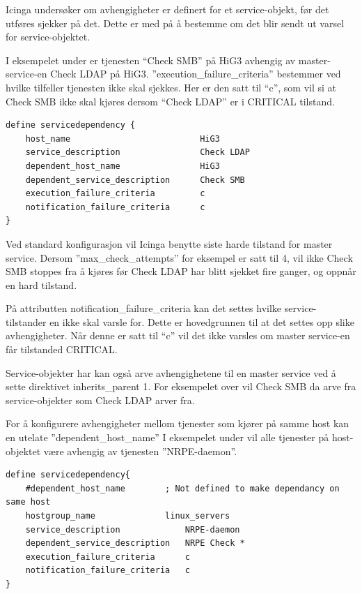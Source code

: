 Icinga undersøker om avhengigheter er definert for et service-objekt, før det utføres sjekker på det. Dette er med på å bestemme om det blir sendt ut varsel for service-objektet.

I eksempelet under er tjenesten ``Check SMB'' på HiG3 avhengig av master-service-en Check LDAP på HiG3. ''execution\_failure\_criteria'' bestemmer ved hvilke tilfeller tjenesten ikke skal sjekkes. Her er den satt til ``c'', som vil si at Check SMB ikke skal kjøres dersom ``Check LDAP'' er i CRITICAL tilstand.

\begin{lstlisting}[style=example]
define servicedependency {
    host_name                          HiG3
    service_description                Check LDAP
    dependent_host_name                HiG3
    dependent_service_description      Check SMB
    execution_failure_criteria         c
    notification_failure_criteria      c
}
\end{lstlisting}

Ved standard konfigurasjon vil Icinga benytte siste harde tilstand for master service. Dersom ''max\_check\_attempts'' for eksempel er satt til 4, vil ikke Check SMB stoppes fra å kjøres før Check LDAP har blitt sjekket fire ganger, og oppnår en hard tilstand. 

På attributten notification\_failure\_criteria kan det settes hvilke service-tilstander en ikke skal varsle for. Dette er hovedgrunnen til at det settes opp slike avhengigheter. Når denne er satt til ``c'' vil det ikke varsles om master service-en får tilstanded CRITICAL.

Service-objekter har kan også arve avhengighetene til en master service ved å sette direktivet inherits\_parent 1. For eksempelet over vil Check SMB da arve fra service-objekter som Check LDAP arver fra.

For å konfigurere avhengigheter mellom tjenester som kjører på samme host kan en utelate ''dependent\_host\_name'' I eksempelet under vil alle tjenester på host-objektet være avhengig av tjenesten ''NRPE-daemon''.

\begin{lstlisting}[style=example]
define servicedependency{
    #dependent_host_name   		; Not defined to make dependancy on same host            
    hostgroup_name           	linux_servers
    service_description         	NRPE-daemon
    dependent_service_description   NRPE Check *
    execution_failure_criteria      c
    notification_failure_criteria   c
}
\end{lstlisting}

